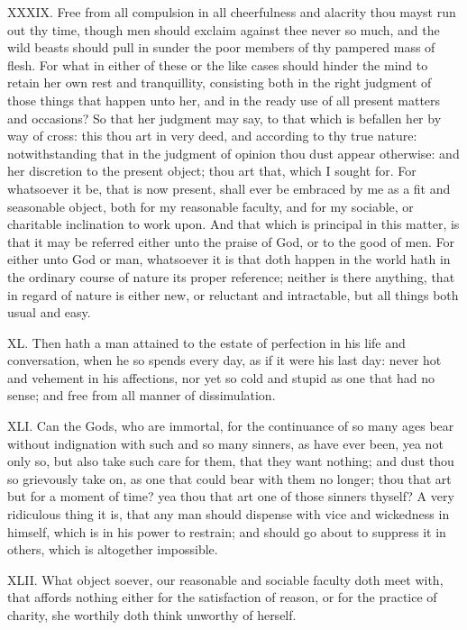 XXXIX. Free from all compulsion in all cheerfulness and alacrity thou
mayst run out thy time, though men should exclaim against thee never so
much, and the wild beasts should pull in sunder the poor members of thy
pampered mass of flesh. For what in either of these or the like cases
should hinder the mind to retain her own rest and tranquillity, consisting
both in the right judgment of those things that happen unto her, and in
the ready use of all present matters and occasions? So that her judgment
may say, to that which is befallen her by way of cross: this thou art in
very deed, and according to thy true nature: notwithstanding that in the
judgment of opinion thou dust appear otherwise: and her discretion to the
present object; thou art that, which I sought for. For whatsoever it be,
that is now present, shall ever be embraced by me as a fit and seasonable
object, both for my reasonable faculty, and for my sociable, or charitable
inclination to work upon. And that which is principal in this matter, is
that it may be referred either unto the praise of God, or to the good of
men. For either unto God or man, whatsoever it is that doth happen in the
world hath in the ordinary course of nature its proper reference; neither
is there anything, that in regard of nature is either new, or reluctant
and intractable, but all things both usual and easy.

XL. Then hath a man attained to the estate of perfection in his life and
conversation, when he so spends every day, as if it were his last day:
never hot and vehement in his affections, nor yet so cold and stupid as
one that had no sense; and free from all manner of dissimulation.

XLI. Can the Gods, who are immortal, for the continuance of so many ages
bear without indignation with such and so many sinners, as have ever been,
yea not only so, but also take such care for them, that they want nothing;
and dust thou so grievously take on, as one that could bear with them no
longer; thou that art but for a moment of time? yea thou that art one of
those sinners thyself? A very ridiculous thing it is, that any man should
dispense with vice and wickedness in himself, which is in his power to
restrain; and should go about to suppress it in others, which is
altogether impossible.

XLII. What object soever, our reasonable and sociable faculty doth meet
with, that affords nothing either for the satisfaction of reason, or for
the practice of charity, she worthily doth think unworthy of herself.

